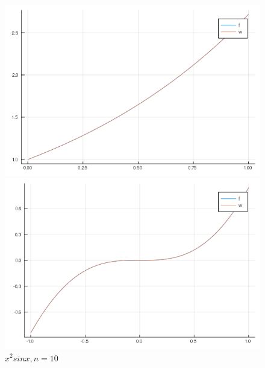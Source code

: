\documentclass[12pt]{article}
\begin{document}
\begin{figure}[!htb]
  \includegraphics[width=\linewidth]{myplot_1_15.png}
  \caption{$e^x, n=5$}
\endminipage\hfill
{}
  \includegraphics[width=\linewidth]{myplot_2_5.png}
  \caption{$x^2sin x, n=10$}
\endminipage
\end{figure}
\end{document}

